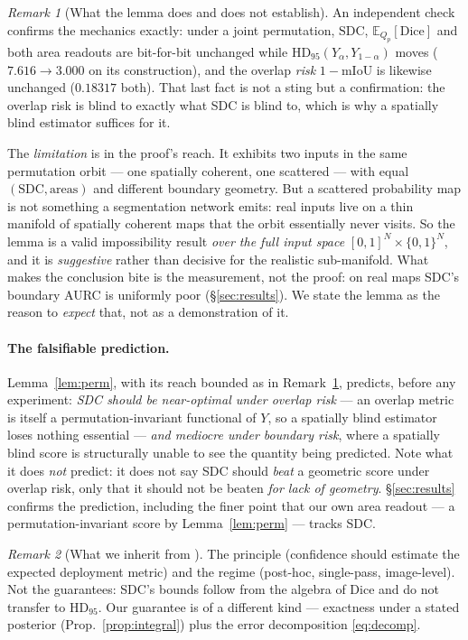 \documentclass[11pt]{article}
\theoremstyle{remark}
\newtheorem{remark}{Remark}
\newcommand{\Ylo}{Y_{\alpha}}
\newcommand{\Yhi}{Y_{1-\alpha}}
\newcommand{\HDF}{\mathrm{HD}_{95}}
\newcommand{\Dice}{\mathrm{Dice}}
\newcommand{\SDC}{\mathrm{SDC}}
\newcommand{\Ex}{\mathbb{E}}
\begin{document}
\begin{remark}[What the lemma does and does not establish]\label{rem:permlimit}
An independent check confirms the mechanics exactly: under a joint permutation, $\SDC$,
$\Ex_{Q_p}[\Dice]$ and both area readouts are bit-for-bit unchanged while
$\HDF(\Ylo,\Yhi)$ moves ($7.616 \to 3.000$ on its construction), and the overlap
\emph{risk} $1-\mathrm{mIoU}$ is likewise unchanged ($0.18317$ both). That last fact is
not a sting but a confirmation: the overlap risk is blind to exactly what SDC is blind
to, which is why a spatially blind estimator suffices for it.

The \emph{limitation} is in the proof's reach. It exhibits two inputs in the same
permutation orbit --- one spatially coherent, one scattered --- with equal
$(\SDC, \text{areas})$ and different boundary geometry. But a scattered probability map
is not something a segmentation network emits: real inputs live on a thin manifold of
spatially coherent maps that the orbit essentially never visits. So the lemma is a
valid impossibility result \emph{over the full input space} $[0,1]^N\!\times\!\{0,1\}^N$,
and it is \emph{suggestive} rather than decisive for the realistic sub-manifold. What
makes the conclusion bite is the measurement, not the proof: on real maps SDC's
boundary AURC is uniformly poor (\S\ref{sec:results}). We state the lemma as the reason
to \emph{expect} that, not as a demonstration of it.
\end{remark}

\paragraph{The falsifiable prediction.} Lemma~\ref{lem:perm}, with its reach bounded as
in Remark~\ref{rem:permlimit}, predicts, before any
experiment: \emph{SDC should be near-optimal under overlap risk} --- an overlap
metric is itself a permutation-invariant functional of $Y$, so a spatially blind
estimator loses nothing essential --- \emph{and mediocre under boundary risk}, where
a spatially blind score is structurally unable to see the quantity being predicted.
Note what it does \emph{not} predict: it does not say SDC should \emph{beat} a
geometric score under overlap risk, only that it should not be beaten \emph{for
lack of geometry}. \S\ref{sec:results} confirms the prediction, including the
finer point that our own area readout --- a permutation-invariant score by
Lemma~\ref{lem:perm} --- tracks SDC.

\begin{remark}[What we inherit from \cite{sdc}]
The principle (confidence should estimate the expected deployment metric) and the
regime (post-hoc, single-pass, image-level). Not the guarantees: SDC's bounds follow
from the algebra of Dice and do not transfer to $\HDF$. Our guarantee is of a
different kind --- exactness under a stated posterior (Prop.~\ref{prop:integral})
plus the error decomposition \eqref{eq:decomp}.
\end{remark}
\end{document}
